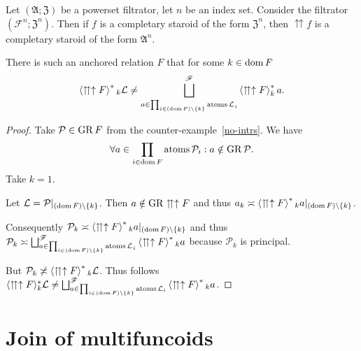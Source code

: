 \begin{conjecture}
Let $(\mathfrak{A};\mathfrak{Z})$ be a powerset filtrator, let $n$
be an index set. Consider the filtrator $(\mathscr{F}^{n};\mathfrak{Z}^{n})$.
Then if $f$ is a completary staroid of the form $\mathfrak{Z}^{n}$,
then $\upuparrows f$ is a completary staroid of the form $\mathfrak{A}^{n}$.
\end{conjecture}

\begin{example}
There is such an anchored relation $F$ that for some $k\in\operatorname{dom} F$
\[
\left\langle \upuparrows\uparrow F\right\rangle ^{\ast}{}_{k}\mathcal{L}\neq\bigsqcup_{a\in\prod_{i\in(\operatorname{dom} F)\setminus\{k\}}\operatorname{atoms}\mathcal{L_{}}_{i}}^{\mathscr{F}}\left\langle \upuparrows\uparrow F\right\rangle ^{\ast}_{k}a.
\]
\end{example}
\begin{proof}
Take $\mathcal{P}\in\operatorname{GR} F$ from the counter-example~\ref{no-intrs}. We
have 
\[
\forall a\in\prod_{i\in\operatorname{dom} F}\operatorname{atoms}\mathcal{P}_{i}:a\notin\operatorname{GR}\mathcal{P}.
\]
Take $k=1$.

Let $\mathcal{L}=\mathcal{P}|_{(\operatorname{dom} F)\setminus\{k\}}$. Then $a\notin\operatorname{GR}\upuparrows\uparrow F$
and thus $a_{k}\asymp\left\langle \upuparrows\uparrow F\right\rangle ^{\ast}{}_{k}a|_{(\operatorname{dom} F)\setminus\{k\}}$.

Consequently $\mathcal{P}_{k}\asymp\left\langle \upuparrows\uparrow F\right\rangle ^{\ast}{}_{k}a|_{(\operatorname{dom} F)\setminus\{k\}}$
and thus $\mathcal{P}_{k}\asymp\bigsqcup_{a\in\prod_{i\in(\operatorname{dom} F)\setminus\{k\}}\operatorname{atoms}\mathcal{L_{}}_{i}}^{\mathscr{F}}\left\langle \upuparrows\uparrow F\right\rangle ^{\ast}{}_{k}a$
because $\mathcal{P}_{k}$ is principal.

But $\mathcal{P}_{k}\not\asymp\left\langle \upuparrows\uparrow F\right\rangle ^{\ast}{}_{k}\mathcal{L}$.
Thus follows $\langle\upuparrows\uparrow F\rangle_{k}^{\ast}\mathcal{L}\neq\bigsqcup_{a\in\prod_{i\in(\operatorname{dom} F)\setminus\{k\}}\operatorname{atoms}\mathcal{L}_{i}}^{\mathscr{F}}\left\langle \upuparrows\uparrow F\right\rangle ^{\ast}{}_{k}a$.\end{proof}
\section{Join of multifuncoids}


